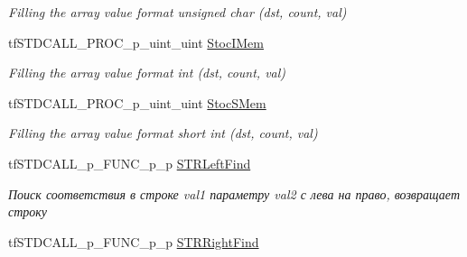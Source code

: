 \begin{DoxyCompactItemize}
\begin{DoxyCompactList}\small\item\em Filling the array value format unsigned char (dst, count, val) \end{DoxyCompactList}\item 
\hypertarget{structs_functions_extension_c_p_u_aa0a57f8cc826f956d500e880be78cff0}{tf\-S\-T\-D\-C\-A\-L\-L\-\_\-\-P\-R\-O\-C\-\_\-p\-\_\-uint\-\_\-uint \hyperlink{structs_functions_extension_c_p_u_aa0a57f8cc826f956d500e880be78cff0}{Stoc\-I\-Mem}}\label{structs_functions_extension_c_p_u_aa0a57f8cc826f956d500e880be78cff0}

\begin{DoxyCompactList}\small\item\em Filling the array value format int (dst, count, val) \end{DoxyCompactList}\item 
\hypertarget{structs_functions_extension_c_p_u_ae7bbb79b3eb02b404f357555ec2b5d03}{tf\-S\-T\-D\-C\-A\-L\-L\-\_\-\-P\-R\-O\-C\-\_\-p\-\_\-uint\-\_\-uint \hyperlink{structs_functions_extension_c_p_u_ae7bbb79b3eb02b404f357555ec2b5d03}{Stoc\-S\-Mem}}\label{structs_functions_extension_c_p_u_ae7bbb79b3eb02b404f357555ec2b5d03}

\begin{DoxyCompactList}\small\item\em Filling the array value format short int (dst, count, val) \end{DoxyCompactList}\item 
\hypertarget{structs_functions_extension_c_p_u_a296bbec7e65bd77b5fc0e8f47261cc9d}{tf\-S\-T\-D\-C\-A\-L\-L\-\_\-p\-\_\-\-F\-U\-N\-C\-\_\-p\-\_\-p \hyperlink{structs_functions_extension_c_p_u_a296bbec7e65bd77b5fc0e8f47261cc9d}{S\-T\-R\-Left\-Find}}\label{structs_functions_extension_c_p_u_a296bbec7e65bd77b5fc0e8f47261cc9d}

\begin{DoxyCompactList}\small\item\em Поиск соответствия в строке val1 параметру val2 с лева на право, возвращает строку \end{DoxyCompactList}\item 
\hypertarget{structs_functions_extension_c_p_u_a1882aa00356226bfe81e93975a073765}{tf\-S\-T\-D\-C\-A\-L\-L\-\_\-p\-\_\-\-F\-U\-N\-C\-\_\-p\-\_\-p \hyperlink{structs_functions_extension_c_p_u_a1882aa00356226bfe81e93975a073765}{S\-T\-R\-Right\-Find}}\label{structs_functions_extension_c_p_u_a1882aa00356226bfe81e93975a073765}


\end{DoxyCompactItemize}
